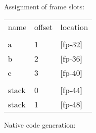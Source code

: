\begin{slide*}
\renewcommand{\arraystretch}{0.9}
Assignment of frame slots:
\vspace*{0.5ex}

\begin{center}
\begin{scriptsize}
\begin{tt}
\begin{tabular}{l@{~~~}l@{~~~}l}
name & offset & location \\ \\
a & 1 & [fp-32] \\
                 b    & 2  &  [fp-36]\\
                 c    & 3  &  [fp-40]\\
 \\
               stack  & 0  &  [fp-44]\\
               stack  & 1  &  [fp-48]
\end{tabular}
\end{tt}
\end{scriptsize}
\end{center}
\vspace*{0.5ex}

Native code generation:


\end{slide*}
